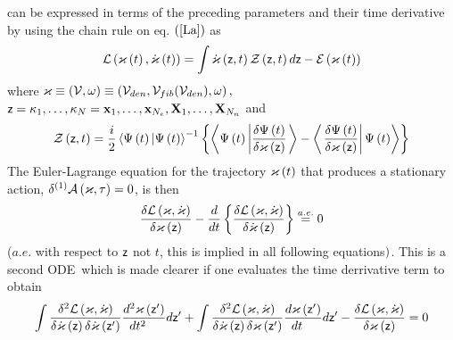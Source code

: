 can be expressed in terms of the preceding parameters and their time
derivative by using the chain rule on eq. $\left( \ref{La}\right) $ as 
\begin{equation}
{\cal L}\left( {\cal \varkappa }\left( t\right) ,{\cal \dot{\varkappa}}%
\left( t\right) \right) =\int {\cal \dot{\varkappa}}\left( {\sf z},t\right) 
{\cal Z}\left( {\sf z},t\right) d{\sf z}-{\cal E}\left( {\cal \varkappa }%
\left( t\right) \right)  \label{ladef}
\end{equation}%
where ${\cal \varkappa }\equiv \left( {\cal V},\omega \right) \equiv \left( 
{\cal V}_{den},{\cal V}_{fib}({\cal V}_{den}),\omega \right) ,$ ${\sf z}%
=\kappa _{1},\ldots ,\kappa _{N}={\bf x}_{1},\ldots ,{\bf x}_{N_{e}},{\bf X}%
_{1},\ldots ,{\bf X}_{N_{n}}$ and 
\begin{equation}
{\cal Z}\left( {\sf z},t\right) =\frac{i}{2}\left\langle \Psi \left(
t\right) |\Psi \left( t\right) \right\rangle ^{-1}\left\{ \left\langle \Psi
\left( t\right) \left| \frac{\delta \Psi \left( t\right) }{\delta {\cal %
\varkappa }\left( {\sf z}\right) }\right. \right\rangle -\left\langle \left. 
\frac{\delta \Psi \left( t\right) }{\delta {\cal \varkappa }\left( {\sf z}%
\right) }\right| \Psi \left( t\right) \right\rangle \right\}
\end{equation}%
The Euler-Lagrange equation for the trajectory ${\cal \varkappa }\left(
t\right) $ that produces a stationary action, $\delta ^{\left( 1\right) }%
{\cal A}\left( {\cal \varkappa },\tau \right) =0$, is then 
\begin{equation}
\frac{\delta {\cal L}\left( {\cal \varkappa },{\cal \dot{\varkappa}}\right) 
}{\delta {\cal \varkappa }\left( {\sf z}\right) }-\frac{d}{dt}\left\{ \frac{%
\delta {\cal L}\left( {\cal \varkappa },{\cal \dot{\varkappa}}\right) }{%
\delta {\cal \dot{\varkappa}}\left( {\sf z}\right) }\right\} \stackrel{a.e.}{%
=}0  \label{EL}
\end{equation}%
($a.e.$ with respect to ${\sf z}$ not $t$, this is implied in all following
equations${\sf )}$. This is a second ODE\ which is made clearer if one
evaluates the time derrivative term to obtain 
\begin{equation}
\int \frac{\delta ^{2}{\cal L}\left( {\cal \varkappa },{\cal \dot{\varkappa}}%
\right) }{\delta {\cal \dot{\varkappa}}\left( {\sf z}\right) \delta {\cal 
\dot{\varkappa}}\left( {\sf z}^{\prime }\right) }\frac{d^{2}{\cal \varkappa }%
\left( {\sf z}^{\prime }\right) }{dt^{2}\quad }d{\sf z}^{\prime }+\int \frac{%
\delta ^{2}{\cal L}\left( {\cal \varkappa },{\cal \dot{\varkappa}}\right) }{%
\delta {\cal \dot{\varkappa}}\left( {\sf z}\right) \delta {\cal \varkappa }%
\left( {\sf z}^{\prime }\right) }\frac{d{\cal \varkappa }\left( {\sf z}%
^{\prime }\right) }{dt\quad }d{\sf z}^{\prime }-\frac{\delta {\cal L}\left( 
{\cal \varkappa },{\cal \dot{\varkappa}}\right) }{\delta {\cal \varkappa }%
\left( {\sf z}\right) }=0
\end{equation}

